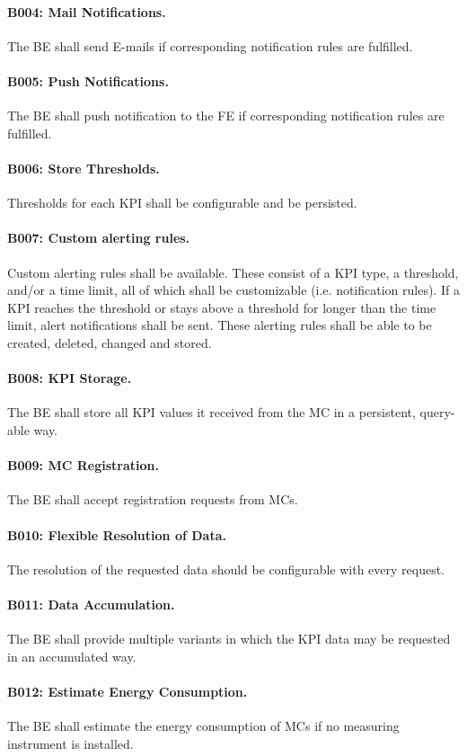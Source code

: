 \documentclass{scrreprt}
\begin{document}
\paragraph{B004: Mail Notifications.} The BE shall send E-mails if corresponding notification rules are fulfilled.
\paragraph{B005: Push Notifications.} The BE shall push notification to the FE if corresponding notification rules are fulfilled.
\paragraph{B006: Store Thresholds.} Thresholds for each KPI shall be configurable and be persisted.
\paragraph{B007: Custom alerting rules.} Custom alerting rules shall be available. These consist of a KPI type, a threshold, and/or a time limit, all of which shall be customizable (i.e. notification rules). If a KPI reaches the threshold or stays above a threshold for longer than the time limit, alert notifications shall be sent. These alerting rules shall be able to be created, deleted, changed and stored.
\paragraph{B008: KPI Storage.} The BE shall store all KPI values it received from the MC in a persistent, query-able way.
\paragraph{B009: MC Registration.} The BE shall accept registration requests from MCs.
\paragraph{B010: Flexible Resolution of Data.} The resolution of the requested data should be configurable with every request.
\paragraph{B011: Data Accumulation.} The BE shall provide multiple variants in which the KPI data may be requested in an accumulated way.
\paragraph{B012: Estimate Energy Consumption.} The BE shall estimate the energy consumption of  MCs if no measuring instrument is installed.
\end{document}

